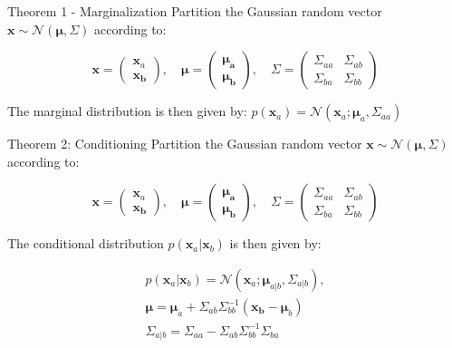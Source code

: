 \begin{definition}{Theorem 1 - Marginalization}
Partition the Gaussian random vector $\bm{x} \sim \mathcal{N}(\bm{\mu}, \Sigma)$ according to:

 \begin{equation}
    \bm{x} = \begin{pmatrix} \bm{x}_a \\ \bm{x_b} \end{pmatrix}, \quad \bm{\mu} = \begin{pmatrix} \bm{\mu_a} \\ \bm{\mu_b} \end{pmatrix}, \quad \Sigma = \begin{pmatrix} \Sigma_{aa}& \Sigma_{ab} \\ \Sigma_{ba}& \Sigma_{bb} \end{pmatrix}
 \end{equation}

 The marginal distribution is then given by: $p(\bm{x}_a) = \mathcal{N}(\bm{x}_a ; \bm{\mu}_a, \Sigma_{aa})$ 

\end{definition}

\begin{definition}{Theorem 2: Conditioning }
    Partition the Gaussian random vector $\bm{x} \sim \mathcal{N}(\bm{\mu}, \Sigma)$ according to:

    \begin{equation}
        \bm{x} = \begin{pmatrix} \bm{x}_a \\ \bm{x_b} \end{pmatrix}, \quad \bm{\mu} = \begin{pmatrix} \bm{\mu_a} \\ \bm{\mu_b} \end{pmatrix}, \quad \Sigma = \begin{pmatrix} \Sigma_{aa}& \Sigma_{ab} \\ \Sigma_{ba}& \Sigma_{bb} \end{pmatrix}
     \end{equation}
    
The conditional distribution $p(\bm{x}_a|\bm{x}_b)$ is then given by:

\begin{equation}
\begin{aligned}
    p(\bm{x}_a|\bm{x}_b) = \mathcal{N}(\bm{x}_a;\bm{\mu}_{a|b}, \Sigma_{a|b}), \\
    \bm{\mu} = \bm{\mu}_a + \Sigma_{ab}\Sigma_{bb}^{-1}(\bm{x_b}-\bm{\mu}_b) \\
    \Sigma_{a|b} = \Sigma_{aa} - \Sigma_{ab} \Sigma_{bb}^{-1} \Sigma_{ba}
\end{aligned}
\end{equation}

\end{definition}

